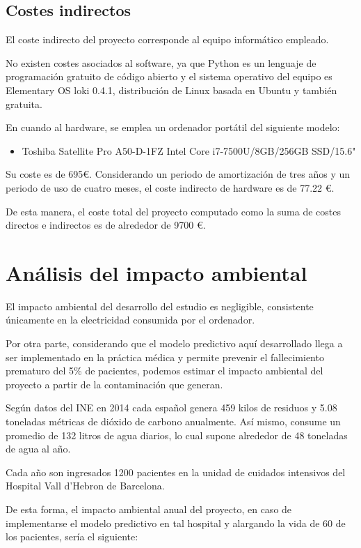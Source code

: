 \documentclass{report}
\begin{document}
\section{Costes indirectos}
El coste indirecto del proyecto corresponde al equipo informático
empleado.

No existen costes asociados al software, ya que Python es un lenguaje de
programación gratuito de código abierto y el sistema operativo del
equipo es Elementary OS loki 0.4.1, distribución de Linux basada en
Ubuntu y también gratuita.

En cuando al hardware, se emplea un ordenador portátil del siguiente
modelo:

\begin{itemize}
\item
  Toshiba Satellite Pro A50-D-1FZ Intel Core i7-7500U/8GB/256GB
  SSD/15.6" 
\end{itemize}

Su coste es de 695\euro. Considerando un periodo de amortización de tres
años y un periodo de uso de cuatro meses, el coste indirecto de hardware
es de 77.22 \euro.

De esta manera, el coste total del proyecto computado como la suma de
costes directos e indirectos es de alrededor de 9700 \euro.

\chapter{Análisis del impacto ambiental}
El impacto ambiental del desarrollo del estudio es negligible,
consistente únicamente en la electricidad consumida por el ordenador.

Por otra parte, considerando que el modelo predictivo aquí desarrollado
llega a ser implementado en la práctica médica y permite prevenir el
fallecimiento prematuro del 5\% de pacientes, podemos estimar el impacto
ambiental del proyecto a partir de la contaminación que generan.

Según datos del INE en 2014 cada español genera 459 kilos de residuos y
5.08 toneladas métricas de dióxido de carbono anualmente. Así mismo,
consume un promedio de 132 litros de agua diarios, lo cual supone
alrededor de 48 toneladas de agua al año.

Cada año son ingresados 1200 pacientes en la unidad de cuidados
intensivos del Hospital Vall d'Hebron de Barcelona.

De esta forma, el impacto ambiental anual del proyecto, en caso de
implementarse el modelo predictivo en tal hospital y alargando la vida
de 60 de los pacientes, sería el siguiente:
\end{document}
